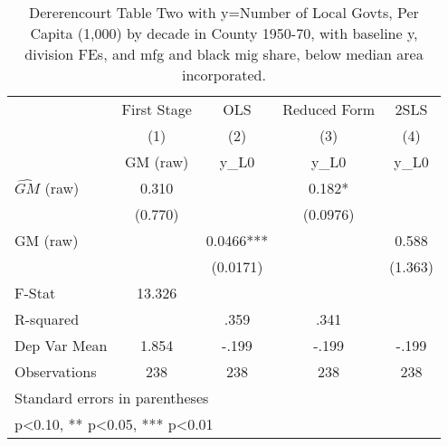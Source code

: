 \begin{table}[htbp]\centering
\def\sym#1{\ifmmode^{#1}\else\(^{#1}\)\fi}
\caption{Dererencourt Table Two with y=Number of Local Govts, Per Capita (1,000) by decade in County 1950-70, with baseline y, division FEs, and mfg and black mig share, below median area incorporated.}
\begin{tabular}{l*{4}{c}}
\toprule
                    & First Stage   &         OLS   &Reduced Form   &        2SLS   \\
                    &\multicolumn{1}{c}{(1)}&\multicolumn{1}{c}{(2)}&\multicolumn{1}{c}{(3)}&\multicolumn{1}{c}{(4)}\\
                    &\multicolumn{1}{c}{GM  (raw)}&\multicolumn{1}{c}{y\_L0}&\multicolumn{1}{c}{y\_L0}&\multicolumn{1}{c}{y\_L0}\\
\midrule
$\hat{GM}$ (raw)    &       0.310   &               &       0.182*  &               \\
                    &     (0.770)   &               &    (0.0976)   &               \\
\addlinespace
GM  (raw)           &               &      0.0466***&               &       0.588   \\
                    &               &    (0.0171)   &               &     (1.363)   \\
\midrule
F-Stat              &      13.326   &               &               &               \\
R-squared           &               &        .359   &        .341   &               \\
Dep Var Mean        &       1.854   &       -.199   &       -.199   &       -.199   \\
Observations        &         238   &         238   &         238   &         238   \\
\bottomrule
\multicolumn{5}{l}{\footnotesize Standard errors in parentheses}\\
\multicolumn{5}{l}{\footnotesize * p<0.10, ** p<0.05, *** p<0.01}\\
\end{tabular}
\end{table}
